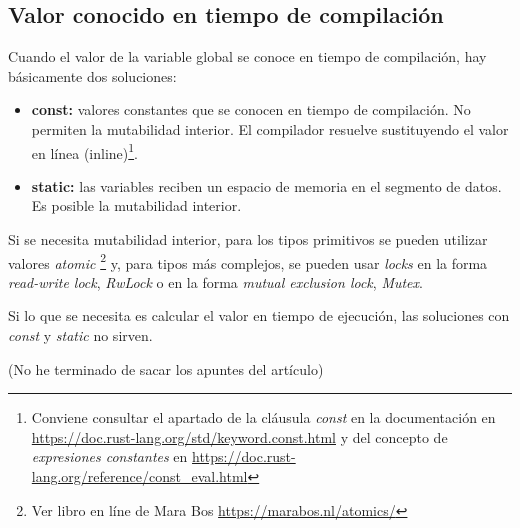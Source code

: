 \documentclass[a4paper,11pt]{extarticle}
\begin{document}
\subsection{Valor conocido en tiempo de compilación}
Cuando el valor de la variable global se conoce en tiempo de compilación, hay básicamente dos soluciones:
\begin{itemize}
	\item \textbf{const:} valores constantes que se conocen en tiempo de compilación. No permiten la mutabilidad interior. El compilador resuelve sustituyendo el valor en línea (inline)\footnote{Conviene consultar el apartado de la cláusula \textit{const} en la documentación en  \url{https://doc.rust-lang.org/std/keyword.const.html} y del concepto de \textit{expresiones constantes} en \url{https://doc.rust-lang.org/reference/const_eval.html}}. 
	\item \textbf{static:} las variables reciben un espacio de memoria en el segmento de datos. Es posible la mutabilidad interior.
\end{itemize}

Si se necesita mutabilidad interior, para los tipos primitivos se pueden utilizar valores \textit{atomic} \footnote{Ver libro en líne de Mara Bos \url{https://marabos.nl/atomics/}} y, para tipos más complejos, se pueden usar \textit{locks} en la forma \textit{read-write lock}, \textit{RwLock} o en la forma \textit{mutual exclusion lock}, \textit{Mutex}. 

Si lo que se necesita es calcular el valor en tiempo de ejecución, las soluciones con \textit{const} y \textit{static} no sirven.

{\color{blue}(No he terminado de sacar los apuntes del artículo)}

\pagebreak

\end{document}
